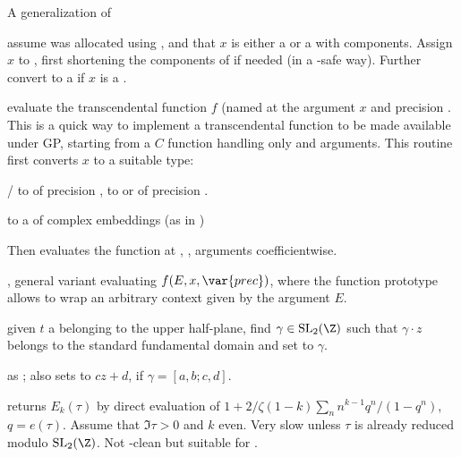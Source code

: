 \noindent A generalization of 

 assume  was allocated using
, and that $x$ is either a  or a 
with  components. Assign $x$ to , first shortening
the components of  if needed (in a -safe way). Further
convert  to a  if $x$ is a .

evaluate the transcendental function $f$ (named  at the argument
$x$ and precision . This is a quick way to implement a transcendental
function to be made available under GP, starting from a $C$ function
handling only  and  arguments. This routine first
converts $x$ to a suitable type:

\item {}/ to  of precision ,  to
 or  of precision .

\item {} to a  of complex embeddings (as in )

Then evaluates the function at , ,  arguments
coefficientwise.

, general variant evaluating $f(E, x, \var{prec})$, where the
function prototype allows to wrap an arbitrary context given by the argument
$E$.


 given $t$ a  belonging to the
upper half-plane, find $\gamma \in \text{SL}_2(\Z)$ such that $\gamma \cdot z$
belongs to the standard fundamental domain and set  to $\gamma$.

 as ; also sets
 to $cz + d$, if $\gamma = [a,b;c,d]$.

 returns $E_k(\tau)$ by direct
evaluation of $1 + 2/\zeta(1-k) \sum_n n^{k-1} q^n/(1-q^n)$, $q = e(\tau)$.
Assume that $\Im \tau > 0$ and $k$ even. Very slow unless $\tau$ is already
reduced modulo $\text{SL}_2(\Z)$. Not -clean but suitable for
.


